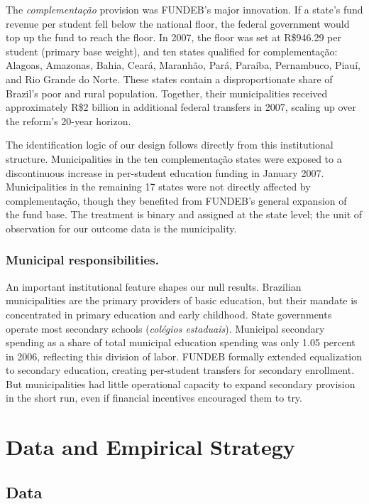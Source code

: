 \documentclass[12pt]{article}
\begin{document}
The \textit{complementa\c{c}\~ao} provision was FUNDEB's major innovation. If a state's
fund revenue per student fell below the national floor, the federal government would top
up the fund to reach the floor. In 2007, the floor was set at R\$946.29 per student
(primary base weight), and ten states qualified for complementa\c{c}\~ao: Alagoas,
Amazonas, Bahia, Cear\'a, Maranh\~ao, Par\'a, Para\'iba, Pernambuco, Piau\'i, and
Rio Grande do Norte. These states contain a disproportionate share of Brazil's poor
and rural population. Together, their municipalities received approximately R\$2 billion
in additional federal transfers in 2007, scaling up over the reform's 20-year horizon.

The identification logic of our design follows directly from this institutional structure.
Municipalities in the ten complementa\c{c}\~ao states were exposed to a discontinuous
increase in per-student education funding in January 2007. Municipalities in the
remaining 17 states were not directly affected by complementa\c{c}\~ao, though they
benefited from FUNDEB's general expansion of the fund base. The treatment is binary and
assigned at the state level; the unit of observation for our outcome data is the
municipality.

\subsubsection*{Municipal responsibilities.} An important institutional feature shapes
our null results. Brazilian municipalities are the primary providers of basic education,
but their mandate is concentrated in primary education and early childhood.
State governments operate most secondary schools (\textit{colégios estaduais}).
Municipal secondary spending as a share of total municipal education spending was only
1.05 percent in 2006, reflecting this division of labor. FUNDEB formally extended
equalization to secondary education, creating per-student transfers for secondary
enrollment. But municipalities had little operational capacity to expand secondary
provision in the short run, even if financial incentives encouraged them to try.

\section{Data and Empirical Strategy}

\subsection{Data}
\end{document}
